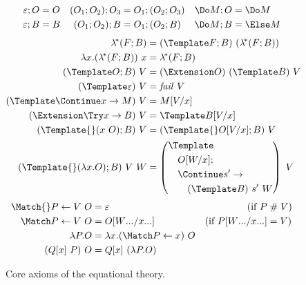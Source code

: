 \begin{figure}[t]
\centering
\small
\begin{align*}
  \varepsilon; O &= O
  &
  (O_1; O_2); O_3 &= O_1; (O_2; O_3)
  &
  \Do M; O &= \Do M
  \\
  \varepsilon; B &= B
  &
  (O_1; O_2); B &= O_1; (O_2; B)
  &
  \Do M; B &= \Else M
\end{align*}
\begin{align*}
  \lamstar (F; B)
  &=
  (\Template F; B) ~ (\lamstar (F; B))
  \\
  \lambda x. (\lamstar (F; B)) ~ x
  &=
  \lamstar (F; B)
  \\
  (\Template O; B) ~ V
  &=
  (\Extension O) ~ (\Template B) ~ V
  \\
  (\Template \varepsilon) ~ V
  &=
  \mathit{fail}~V
  \\
  (\Template \Continue x \to M) ~ V
  &=
  M\subst{x}{V}
  \\
  (\Extension \Try x \to B) ~ V
  &=
  \Template B\subst{x}{V}
  \\
  (\Template{} (x ~ O); B) ~ V
  &=
  (\Template{} O\subst{x}{V}; B) ~ V
  \\
  (\Template{} (\lambda x. O); B) ~ V ~ W
  &=
  \left(
    \begin{aligned}
      &\Template \\
      &\quad O\subst{x}{W}; \\
      &\quad \Continue s' \to \\
      &\qquad (\Template B)~s'~W
    \end{aligned}
  \right)
  ~ V
\end{align*}
\begin{align*}
  \Match{} P \gets V ~ O
  &=
  \varepsilon
  &(\text{if } P &\apart V)
  \\
  \Match P \gets V ~ O
  &=
  O\subst{\many{x}}{\many{W}}
  &(\text{if } P\subst{\many{x}}{\many{W}} &= V)
  \\
  \lambda P. O
  &=
  \lambda x. (\Match P \gets x) ~ O
  \\
  (Q[x] ~ P) ~ O
  &=
  Q[x] ~ (\lambda P. O)
\end{align*}
\caption{Core axioms of the equational theory.}
\label{fig:core-axioms}
\end{figure}

